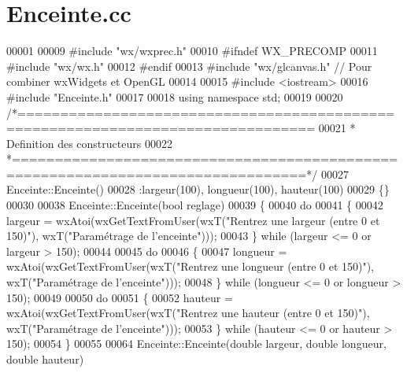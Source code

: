 \section{Enceinte.\+cc}
\label{_enceinte_8cc_source}

\begin{DoxyCode}
00001 
00009 \textcolor{preprocessor}{#include "wx/wxprec.h"}
00010 \textcolor{preprocessor}{#ifndef WX\_PRECOMP}
00011 \textcolor{preprocessor}{#include "wx/wx.h"}
00012 \textcolor{preprocessor}{#endif}
00013 \textcolor{preprocessor}{#include "wx/glcanvas.h"} \textcolor{comment}{// Pour combiner wxWidgets et OpenGL}
00014 
00015 \textcolor{preprocessor}{#include <iostream>}
00016 \textcolor{preprocessor}{#include "Enceinte.h"}
00017 
00018 \textcolor{keyword}{using namespace }std;
00019 
00020 \textcolor{comment}{/*================================================================================}
00021 \textcolor{comment}{ * Definition des constructeurs}
00022 \textcolor{comment}{ *================================================================================*/}
00027 Enceinte::Enceinte()
00028 :largeur(100), longueur(100), hauteur(100)
00029 \{\}
00030 
00038 Enceinte::Enceinte(\textcolor{keywordtype}{bool} reglage)
00039 \{
00040     \textcolor{keywordflow}{do}
00041     \{
00042         largeur = wxAtoi(wxGetTextFromUser(wxT(\textcolor{stringliteral}{"Rentrez une largeur (entre 0 et 150)"}), wxT(\textcolor{stringliteral}{"Paramétrage de
       l'enceinte"})));
00043     \} \textcolor{keywordflow}{while} (largeur <= 0 or largeur > 150);
00044     
00045     \textcolor{keywordflow}{do}
00046     \{
00047         longueur = wxAtoi(wxGetTextFromUser(wxT(\textcolor{stringliteral}{"Rentrez une longueur (entre 0 et 150)"}), wxT(\textcolor{stringliteral}{"Paramétrage
       de l'enceinte"})));
00048     \} \textcolor{keywordflow}{while} (longueur <= 0 or longueur > 150);
00049     
00050     \textcolor{keywordflow}{do}
00051     \{
00052         hauteur = wxAtoi(wxGetTextFromUser(wxT(\textcolor{stringliteral}{"Rentrez une hauteur (entre 0 et 150)"}), wxT(\textcolor{stringliteral}{"Paramétrage de
       l'enceinte"})));
00053     \} \textcolor{keywordflow}{while} (hauteur <= 0 or hauteur > 150);
00054 \}
00055 
00064 Enceinte::Enceinte(\textcolor{keywordtype}{double} largeur, \textcolor{keywordtype}{double} longueur, \textcolor{keywordtype}{double} hauteur)

\end{DoxyCode}
